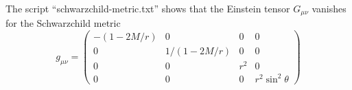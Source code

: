 \documentclass[12pt]{article}
\begin{document}
\noindent
The script ``schwarzchild-metric.txt'' shows that the
Einstein tensor $G_{\mu\nu}$ vanishes for the Schwarzchild metric
$$
g_{\mu\nu}=
\begin{pmatrix}
-(1-2M/r) & 0 & 0 & 0\\
0 & 1/(1-2M/r) & 0 & 0\\
0 & 0 & r^2 & 0\\
0 & 0 & 0 & r^2\sin^2\theta
\end{pmatrix}
$$
\end{document}
